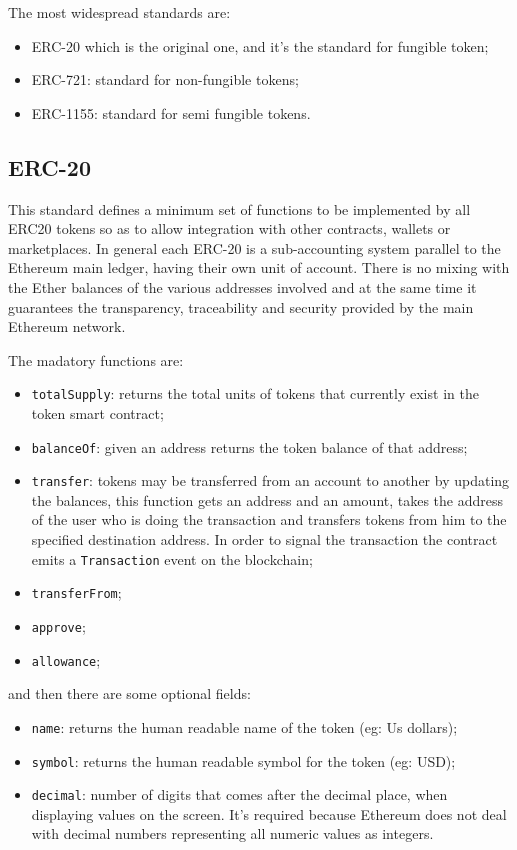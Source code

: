 The most widespread standards are:
\begin{itemize}
    \item ERC-20 which is the original one, and it's the standard for fungible token;
    \item ERC-721: standard for non-fungible tokens;
    \item ERC-1155: standard for semi fungible tokens.
\end{itemize}

\subsection{ERC-20}
This standard defines a minimum set of functions to be implemented by all ERC20 tokens so as to allow integration with other contracts, wallets or marketplaces.
In general each ERC-20 is a sub-accounting system parallel to the Ethereum main ledger, having their own unit of account.
There is no mixing with the Ether balances of the various addresses involved and at the same time it guarantees the transparency, traceability and security provided by the main Ethereum network.

The madatory functions are:
\begin{itemize}
    \item \verb|totalSupply|: returns the total units of tokens that currently exist in the token smart contract;
    \item \verb|balanceOf|: given an address returns the token balance of that address;
    \item \verb|transfer|: tokens may be transferred from an account to another by updating the balances, this function gets an address and an amount, takes the address of the user who is doing the transaction and transfers tokens from him to the specified destination address.
    In order to signal the transaction the contract emits a \verb|Transaction| event on the blockchain;
    \item \verb|transferFrom|;
    \item \verb|approve|;
    \item \verb|allowance|;
\end{itemize}
and then there are some optional fields:
\begin{itemize}
    \item \verb|name|: returns the human readable name of the token (eg: Us dollars);
    \item \verb|symbol|: returns the human readable symbol for the token (eg: USD);
    \item \verb|decimal|: number of digits that comes after the decimal place, when displaying values on the screen.
    It's required because Ethereum does not deal with decimal numbers representing all numeric values as integers.
\end{itemize}

